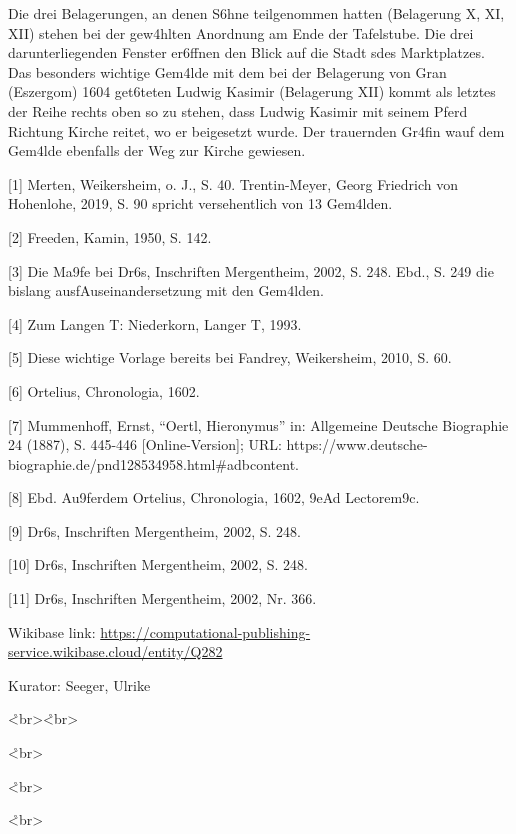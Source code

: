 \documentclass[
  letterpaper,
]{book}
\begin{document}
Die drei Belagerungen, an denen S\xb6hne teilgenommen hatten
(Belagerung X, XI, XII) stehen bei der gew\xa4hlten Anordnung am
Ende der Tafelstube. Die drei darunterliegenden Fenster er\xb6ffnen
den Blick auf die Stadt s\xbcdlich des Marktplatzes. Das besonders
wichtige Gem\xa4lde mit dem bei der Belagerung von Gran (Eszergom)
1604 get\xb6teten Ludwig Kasimir (Belagerung XII) kommt als letztes
der Reihe rechts oben so zu stehen, dass Ludwig Kasimir mit seinem Pferd
Richtung Kirche reitet, wo er beigesetzt wurde. Der trauernden
Gr\xa4fin w\xbcrde auf dem Gem\xa4lde ebenfalls der Weg zur
Kirche gewiesen.

{[}1{]} Merten, Weikersheim, o. J., S. 40. Trentin-Meyer, Georg
Friedrich von Hohenlohe, 2019, S. 90 spricht versehentlich von 13
Gem\xa4lden.

{[}2{]} Freeden, Kamin, 1950, S. 142.

{[}3{]} Die Ma\x9fe bei Dr\xb6s, Inschriften Mergentheim, 2002,
S. 248. Ebd., S. 249 die bislang
ausf\xbchrlichste Auseinandersetzung mit den Gem\xa4lden.

{[}4{]} Zum Langen T\xbcrkenkrieg: Niederkorn, Langer
T\xbcrkenkrieg, 1993.

{[}5{]} Diese wichtige Vorlage bereits bei Fandrey, Weikersheim, 2010,
S. 60.

{[}6{]} Ortelius, Chronologia, 1602.

{[}7{]} Mummenhoff, Ernst, ``Oertl, Hieronymus'' in: Allgemeine Deutsche
Biographie 24 (1887), S. 445-446 {[}Online-Version{]}; URL:
https://www.deutsche-biographie.de/pnd128534958.html\#adbcontent.

{[}8{]} Ebd. Au\x9ferdem Ortelius, Chronologia, 1602, \x9eAd
Lectorem\x9c.

{[}9{]} Dr\xb6s, Inschriften Mergentheim, 2002, S.
248.

{[}10{]} Dr\xb6s, Inschriften Mergentheim, 2002, S.
248.

{[}11{]} Dr\xb6s, Inschriften Mergentheim, 2002, Nr. 366.

Wikibase link:
\url{https://computational-publishing-service.wikibase.cloud/entity/Q282}

Kurator: Seeger, Ulrike

\r<br\textgreater{}\r<br\textgreater{}

\r<br\textgreater{}

\r<br\textgreater{}

\r<br\textgreater{}
\end{document}
